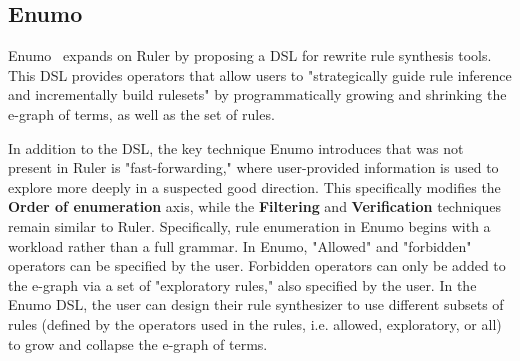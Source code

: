 \documentclass[acmsmall,screen,nonacm]{acmart}
\begin{document}



\subsection{Enumo}
Enumo~\cite{pal2023enumo} expands on Ruler by proposing a DSL for rewrite rule synthesis tools. This DSL provides operators that allow users to "strategically guide rule inference and incrementally build rulesets" by programmatically growing and shrinking the e-graph of terms, as well as the set of rules. 

In addition to the DSL, the key technique Enumo introduces that was not present in Ruler is "fast-forwarding," where user-provided information is used to explore more deeply in a suspected good direction. This specifically modifies the \textbf{Order of enumeration} axis, while the \textbf{Filtering} and \textbf{Verification} techniques remain similar to Ruler. Specifically, rule enumeration in Enumo begins with a workload rather than a full grammar. In Enumo, "Allowed" and "forbidden" operators can be specified by the user. Forbidden operators can only be added to the e-graph via a set of "exploratory rules," also specified by the user. In the Enumo DSL, the user can design their rule synthesizer to use different subsets of rules (defined by the operators used in the rules, i.e. allowed, exploratory, or all) to grow and collapse the e-graph of terms.
\end{document}
